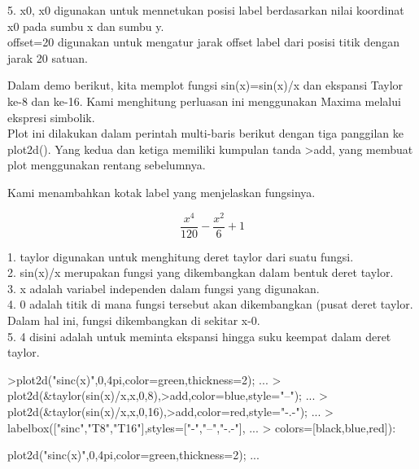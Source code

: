 \documentclass{article}
\begin{document}
\begin{eulernotebook}
\begin{eulercomment}
\begin{eulercomment}
\begin{eulercomment}
\begin{eulercomment}
\begin{eulercomment}
\begin{eulercomment}
\begin{eulercomment}
\begin{eulercomment}
\begin{eulercomment}
\begin{eulercomment}
\begin{eulercomment}
5. x0, x0 digunakan untuk mennetukan posisi label berdasarkan nilai
koordinat x0 pada sumbu x dan sumbu y.\\
offset=20 digunakan untuk mengatur jarak offset label dari posisi
titik dengan jarak 20 satuan.

Dalam demo berikut, kita memplot fungsi sin(x)=sin(x)/x dan ekspansi
Taylor ke-8 dan ke-16. Kami menghitung perluasan ini menggunakan
Maxima melalui ekspresi simbolik.\\
Plot ini dilakukan dalam perintah multi-baris berikut dengan tiga
panggilan ke plot2d(). Yang kedua dan ketiga memiliki kumpulan tanda
\textgreater{}add, yang membuat plot menggunakan rentang sebelumnya.

Kami menambahkan kotak label yang menjelaskan fungsinya.
\end{eulercomment}
\begin{eulerformula}
\[
\frac{x^4}{120}-\frac{x^2}{6}+1
\]
\end{eulerformula}
\begin{eulercomment}
1. \textdollar{}taylor digunakan untuk menghitung deret taylor dari suatu fungsi.\\
2. sin(x)/x merupakan fungsi yang dikembangkan dalam bentuk deret
taylor.\\
3. x adalah variabel independen dalam fungsi yang digunakan.\\
4. 0 adalah titik di mana fungsi tersebut akan dikembangkan (pusat
deret taylor. Dalam hal ini, fungsi dikembangkan di sekitar x-0.\\
5. 4 disini adalah untuk meminta ekspansi hingga suku keempat dalam
deret taylor.
\end{eulercomment}
\begin{eulerprompt}
>plot2d("sinc(x)",0,4pi,color=green,thickness=2); ...
>  plot2d(&taylor(sin(x)/x,x,0,8),>add,color=blue,style="--"); ...
>  plot2d(&taylor(sin(x)/x,x,0,16),>add,color=red,style="-.-"); ...
>  labelbox(["sinc","T8","T16"],styles=["-","--","-.-"], ...
>    colors=[black,blue,red]):
\end{eulerprompt}
\begin{eulercomment}
plot2d("sinc(x)",0,4pi,color=green,thickness=2); ...\\
\end{eulercomment}
\begin{eulerttcomment}

\end{eulerttcomment}
\end{eulercomment}
\end{eulercomment}
\end{eulercomment}
\end{eulercomment}
\end{eulercomment}
\end{eulercomment}
\end{eulercomment}
\end{eulercomment}
\end{eulercomment}
\end{eulercomment}
\end{eulernotebook}
\end{document}
